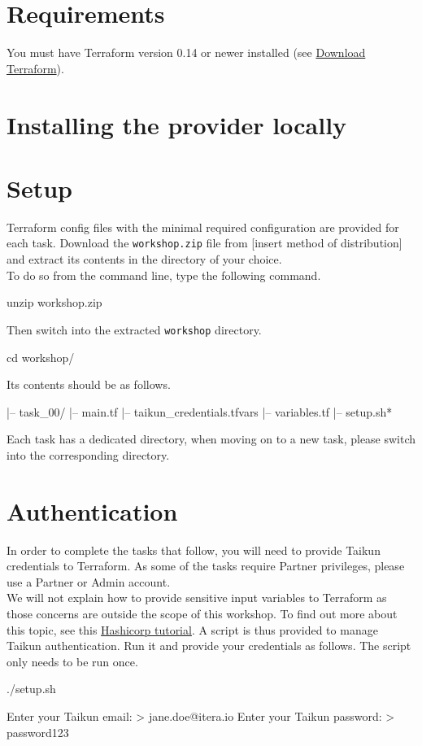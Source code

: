 \section{Requirements}
You must have Terraform version 0.14 or newer installed (see \href{https://www.terraform.io/downloads.html}{Download Terraform}).

\section{Installing the provider locally}
\blindtext{}

\section{Setup}
Terraform config files with the minimal required configuration are provided for each task.
Download the \texttt{workshop.zip} file from [insert method of distribution] %
and extract its contents in the directory of your choice.\\

To do so from the command line, type the following command.
\begin{shell}
unzip workshop.zip
\end{shell}

Then switch into the extracted \texttt{workshop} directory.
\begin{shell}
cd workshop/
\end{shell}
Its contents should be as follows.
\begin{raw}
|-- task_00/
    |-- main.tf
    |-- taikun_credentials.tfvars
    |-- variables.tf
|-- setup.sh*
\end{raw}
Each task has a dedicated directory, when moving on to a new task, please switch into the corresponding directory.

\section{Authentication}
In order to complete the tasks that follow, you will need to provide Taikun credentials to Terraform.
As some of the tasks require Partner privileges, please use a Partner or Admin account.\\

We will not explain how to provide sensitive input variables to Terraform as those concerns are outside the scope of this
workshop. %
To find out more about this topic, see this \href{https://learn.hashicorp.com/tutorials/terraform/sensitive-variables}{Hashicorp tutorial}.
A script is thus provided to manage Taikun authentication.
Run it and provide your credentials as follows. The script only needs to be run once.
\begin{shell}
./setup.sh %
\end{shell}
\begin{raw}
Enter your Taikun email:
> jane.doe@itera.io
Enter your Taikun password:
> password123
\end{raw}
